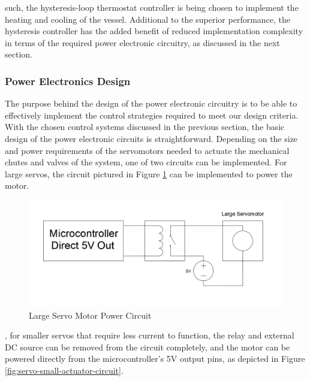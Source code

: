 \documentclass{article}
\begin{document}
 such, the hysteresis-loop thermostat controller is being chosen to implement the heating and cooling of the vessel. Additional to the superior performance, the hysteresis controller has the added benefit of reduced implementation complexity in terms of the required power electronic circuitry, as discussed in the next section.

\subsubsection{Power Electronics Design}
The purpose behind the design of the power electronic circuitry is to be able to effectively implement the control strategies required to meet our design criteria. With the chosen control systems discussed in the previous section, the basic design of the power electronic circuits is straightforward. Depending on the size and power requirements of the servomotors needed to actuate the mechanical chutes and valves of the system, one of two circuits can be implemented. For large servos, the circuit pictured in Figure \ref{fig:servo-large-actuator-circuit} can be implemented to power the motor.

\begin{figure}[H]
\begin{center}
\includegraphics[scale=0.20]{servo-large-actuator-circuit.png}
\caption{Large Servo Motor Power Circuit}
\label{fig:servo-large-actuator-circuit}
\end{center}
\end{figure}

, for smaller servos that require less current to function, the relay and external DC source can be removed from the circuit completely, and the motor can be powered directly from the microcontroller's 5V output pins, as depicted in Figure \ref{fig:servo-small-actuator-circuit}.
\end{document}
